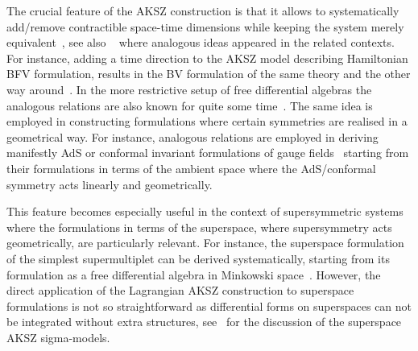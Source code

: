 \documentclass[a4paper,12pt]{article}
\numberwithin{equation}{section} %
\numberwithin{equation}{section}
\begin{document}
The crucial feature of the AKSZ construction is that it allows to systematically add/remove contractible  space-time dimensions while keeping the system merely equivalent~\cite{Barnich:2006hbb}, see also ~\cite{Vasiliev:2001zy,Barnich:2006pc,Bonechi:2009kx,Bekaert:2009fg,Alekseev:2010ud,Cattaneo:2012qu} where analogous ideas appeared in the related contexts. For instance, adding a time direction to the AKSZ model describing Hamiltonian BFV formulation, results in the BV formulation of the same theory and the other way around~\cite{Grigoriev:1999qz,Barnich:2003wj}. In the more restrictive setup of free differential algebras the analogous relations are also known for quite some time~\cite{Sullivan:1977fk,DAuria:1982mkx,Castellani:1991et,Ponomarev:2010ji,Misuna:2013ww}. The same idea is employed in constructing formulations where certain symmetries are realised in a geometrical way. For instance, analogous relations are employed in deriving manifestly AdS or conformal invariant formulations of gauge fields~\cite{Barnich:2006pc,Bekaert:2009fg,Alkalaev:2011zv,Bekaert:2013zya} starting from their formulations in terms of the ambient space where the AdS/conformal symmetry acts linearly and geometrically. 

This feature becomes especially useful in the context of supersymmetric systems where the formulations in terms of the superspace, where supersymmetry acts geometrically, are particularly relevant. For instance, the superspace formulation of the simplest supermultiplet can be derived systematically, starting from its formulation as a free differential algebra in Minkowski space~\cite{Ponomarev:2010ji,Misuna:2013ww}. However, the direct application of the Lagrangian AKSZ construction to superspace formulations is not so straightforward as differential forms on superspaces can not be integrated without extra structures, see~\cite{Grassi:2016apf,Salnikov:2016bny,Hulik:2022hpb} for the discussion of the superspace AKSZ sigma-models.
\end{document}
